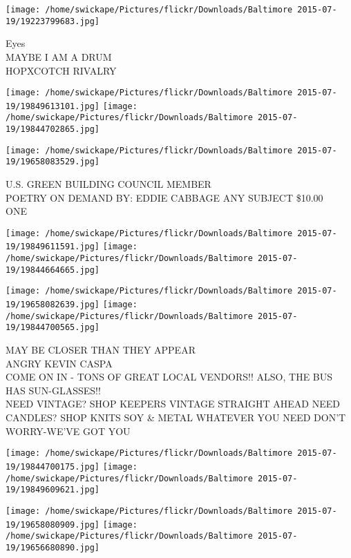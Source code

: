 \documentclass[10pt,letterpaper]{article}
\begin{document}
\vspace{0.25in}
\texttt{[image: /home/swickape/Pictures/flickr/Downloads/Baltimore 2015-07-19/19223799683.jpg]}

Eyes\\
MAYBE I AM A DRUM\\
HOPXCOTCH RIVALRY\\
\pagebreak

\texttt{[image: /home/swickape/Pictures/flickr/Downloads/Baltimore 2015-07-19/19849613101.jpg]}
\texttt{[image: /home/swickape/Pictures/flickr/Downloads/Baltimore 2015-07-19/19844702865.jpg]}

\vspace{0.25in}
\texttt{[image: /home/swickape/Pictures/flickr/Downloads/Baltimore 2015-07-19/19658083529.jpg]}

U.S. GREEN BUILDING COUNCIL MEMBER\\
POETRY ON DEMAND BY: EDDIE CABBAGE ANY SUBJECT \$10.00\\
ONE\\
\pagebreak

\texttt{[image: /home/swickape/Pictures/flickr/Downloads/Baltimore 2015-07-19/19849611591.jpg]}
\texttt{[image: /home/swickape/Pictures/flickr/Downloads/Baltimore 2015-07-19/19844664665.jpg]}

\texttt{[image: /home/swickape/Pictures/flickr/Downloads/Baltimore 2015-07-19/19658082639.jpg]}
\texttt{[image: /home/swickape/Pictures/flickr/Downloads/Baltimore 2015-07-19/19844700565.jpg]}

MAY BE CLOSER THAN THEY APPEAR\\
ANGRY KEVIN CASPA\\
COME ON IN {-} TONS OF GREAT LOCAL VENDORS!! ALSO, THE BUS HAS SUN{-}GLASSES!!\\
NEED VINTAGE?  SHOP KEEPERS VINTAGE STRAIGHT AHEAD NEED CANDLES? SHOP KNITS SOY \& METAL WHATEVER YOU NEED DON'T WORRY{-}WE'VE GOT YOU\\
\pagebreak

\texttt{[image: /home/swickape/Pictures/flickr/Downloads/Baltimore 2015-07-19/19844700175.jpg]}
\texttt{[image: /home/swickape/Pictures/flickr/Downloads/Baltimore 2015-07-19/19849609621.jpg]}

\texttt{[image: /home/swickape/Pictures/flickr/Downloads/Baltimore 2015-07-19/19658080909.jpg]}
\texttt{[image: /home/swickape/Pictures/flickr/Downloads/Baltimore 2015-07-19/19656680890.jpg]}
\end{document}
